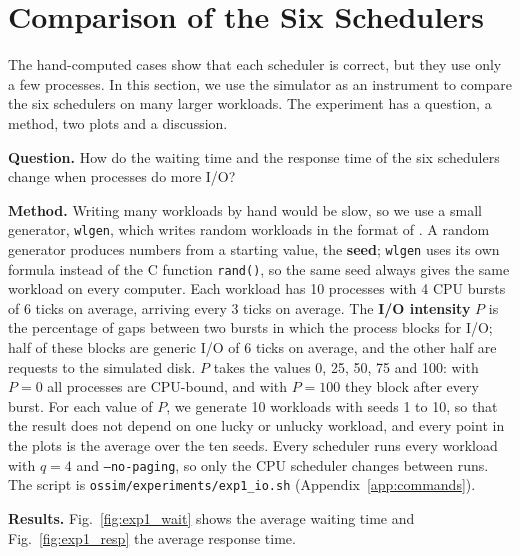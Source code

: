 \section{Comparison of the Six Schedulers}
\label{sec:experiments}
The hand-computed cases show that each scheduler is correct, but they use only a few processes. In this section, we use the simulator as an instrument to compare the six schedulers on many larger workloads. The experiment has a question, a method, two plots and a discussion.

\textbf{Question.} How do the waiting time and the response time of the six schedulers change when processes do more I/O?

\textbf{Method.} Writing many workloads by hand would be slow, so we use a small generator, \texttt{wlgen}, which writes random workloads in the format of \ossim. A random generator produces numbers from a starting value, the \textbf{seed}; \texttt{wlgen} uses its own formula instead of the C function \texttt{rand()}, so the same seed always gives the same workload on every computer. Each workload has 10 processes with 4 CPU bursts of 6 ticks on average, arriving every 3 ticks on average. The \textbf{I/O intensity} $P$ is the percentage of gaps between two bursts in which the process blocks for I/O; half of these blocks are generic I/O of 6 ticks on average, and the other half are requests to the simulated disk. $P$ takes the values 0, 25, 50, 75 and 100: with $P=0$ all processes are CPU-bound, and with $P=100$ they block after every burst. For each value of $P$, we generate 10 workloads with seeds 1 to 10, so that the result does not depend on one lucky or unlucky workload, and every point in the plots is the average over the ten seeds. Every scheduler runs every workload with $q = 4$ and \texttt{--no-paging}, so only the CPU scheduler changes between runs. The script is \texttt{ossim/experiments/exp1\_io.sh} (Appendix~\ref{app:commands}).

\textbf{Results.} Fig.~\ref{fig:exp1_wait} shows the average waiting time and Fig.~\ref{fig:exp1_resp} the average response time.

